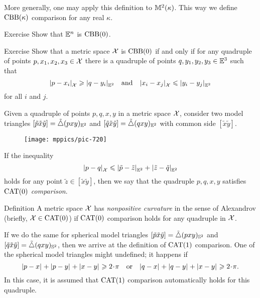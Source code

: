 More generally, one may apply this definition to $\mathbb{M}^2(\kappa)$.
This way we define $\mathrm{CBB}(\kappa)$ comparison for any real $\kappa$.

\begin{thm}{Exercise}
Show that $\mathbb{E}^n$ is $\mathrm{CBB}(0)$.
\end{thm}

\begin{thm}{Exercise}\label{ex:(3+1)-expanding}
Show that a metric space $\mathcal{X}$ is $\mathrm{CBB}(0)$
if and only if for any quadruple of points $p,x_1,x_2,x_3\in \mathcal{X}$ 
there is a quadruple of points $q,y_1,y_2,y_3\in\mathbb{E}^3$
such that 
\[\dist{p}{x_i}{\spc{X}}\ge\dist{q}{y_i}{\EE^2} 
\quad \text{and}\quad
\dist{x_i}{x_j}{\spc{X}}\le\dist{y_i}{y_j}{\EE^2}\] 
for all $i$ and $j$.
\end{thm}

Given a quadruple of points $p,q,x,y$ in a metric space $\mathcal{X}$,
consider two model triangles 
$[\tilde p\tilde x\tilde y]=\tilde\triangle{}(pxy)_{\mathbb{E}^2}$ 
and 
$\trig{\tilde q}{\tilde x}{\tilde y}\z=\modtrig{}(qxy)_{\EE^2}$ with common side $[\tilde x\tilde y]$.

\begin{wrapfigure}{r}{25mm}
\vskip-4mm
\centering
\texttt{[image: mppics/pic-720]}
\end{wrapfigure}

If the inequality
\[\dist{p}{q}{\spc{X}}\le \dist{\tilde p}{\tilde z}{\EE^2}+\dist{\tilde z}{\tilde q}{\EE^2}\]
holds for any point $\tilde z\in [\tilde x\tilde y]$, then we say that 
the quadruple $p,q,x,y$ satisfies \index{$\CAT$}\emph{$\mathrm{CAT}(0)$ comparison}.
\label{page:CAT-comparison}

\begin{thm}{Definition}\label{def:CBB}
A metric space $\mathcal{X}$ has \index{$\CAT$}\emph{nonpositive curvature} in the sense of Alexandrov (briefly, $\mathcal{X}\in\mathrm{CAT}(0)$) if $\mathrm{CAT}(0)$ comparison holds for any quadruple in $\mathcal{X}$.
\end{thm}

If we do the same for spherical model triangles  
$[\tilde p\tilde x\tilde y]=\tilde\triangle{}(pxy)_{\mathbb{S}^2}$ 
and 
$[\tilde q\tilde x\tilde y]=\tilde\triangle{}(qxy)_{\mathbb{S}^2}$,
then we arrive at the definition of $\mathrm{CAT}(1)$ comparison.
One of the spherical model triangles might undefined;
it happens if 
\[\dist{p}{x}{}+\dist{p}{y}{}+\dist{x}{y}{}\ge 2\cdot\pi
\quad
\text{or}
\quad
\dist{q}{x}{}+\dist{q}{y}{}+\dist{x}{y}{}\ge 2\cdot\pi.\]
In this case, it is assumed that $\mathrm{CAT}(1)$ comparison automatically holds for this quadruple.

